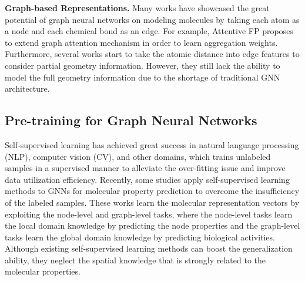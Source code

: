 \documentclass{article}
\begin{document}
\textbf{Graph-based Representations.}
Many works \cite{DBLP:journals/corr/abs-2004-08919,DBLP:conf/nips/RongBXX0HH20,DBLP:journals/corr/abs-1909-00259,DBLP:conf/icdm/ShuiK20,DBLP:conf/icml/GilmerSRVD17} have showcased the great potential of graph neural networks on modeling molecules by taking each atom as a node and each chemical bond as an edge. For example, Attentive FP \cite{doi:10.1021/acs.jmedchem.9b00959} proposes to extend graph attention mechanism in order to learn aggregation weights. Furthermore, several works \cite{DBLP:conf/nips/SchuttKFCTM17,DBLP:journals/corr/abs-2102-07933} start to take the atomic distance into edge features to consider partial geometry information. However, they still lack the ability to model the full geometry information due to the shortage of traditional GNN architecture.

\subsection{Pre-training for Graph Neural Networks}
Self-supervised learning \cite{DBLP:conf/naacl/DevlinCLT19,DBLP:journals/corr/DoerschGE15,gidaris2018unsupervised,DBLP:journals/corr/abs-2006-03654,DBLP:journals/corr/abs-2012-11175} has achieved great success in natural language processing (NLP), computer vision (CV), and other domains, which trains unlabeled samples in a supervised manner to alleviate the over-fitting issue and improve data utilization efficiency. Recently, some studies \cite{DBLP:conf/iclr/HuLGZLPL20,DBLP:conf/nips/RongBXX0HH20} apply self-supervised learning methods to GNNs for molecular property prediction to overcome the insufficiency of the labeled samples. These works learn the molecular representation vectors by exploiting the node-level and graph-level tasks, where the node-level tasks learn the local domain knowledge by predicting the node properties and the graph-level tasks learn the global domain knowledge by predicting biological activities. Although existing self-supervised learning methods can boost the generalization ability, they neglect the spatial knowledge that is strongly related to the molecular properties.
\end{document}
